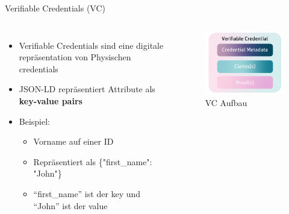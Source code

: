 \documentclass[
	german,%
	authorontitle=true,
	]{bfhbeamer}
\begin{document}
\begin{frame}{Verifiable Credentials (VC)}
    \begin{columns}[onlytextwidth,T]
        \column{70mm}  

    \begin{itemize}
        \item Verifiable Credentials sind eine digitale repräsentation von Physischen credentials
        \item JSON-LD repräsentiert Attribute als \textbf{key-value pairs}
        \item Beispiel:
        \begin{itemize}
            \item Vorname auf einer ID
            \item Repräsentiert als \{"first\_name": "John"\}
            \item ``first\_name'' ist der key und ``John'' ist der value
        \end{itemize}
    \end{itemize}

    \column{70mm}
    \begin{figure}
        \centering
        \includegraphics[width=70mm]{../img/VC.png}
        \caption{VC Aufbau}
    \end{figure}

    \end{columns}
\end{frame}
\end{document}

